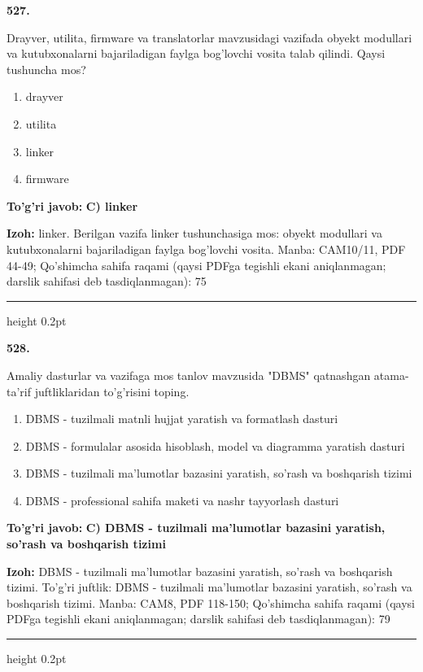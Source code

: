 \documentclass[10pt,a4paper]{article}
\begin{document}
{\bfseries\sffamily\color{ink} 527.}
\par
Drayver, utilita, firmware va translatorlar mavzusidagi vazifada obyekt modullari va kutubxonalarni bajariladigan faylga bog'lovchi vosita talab qilindi. Qaysi tushuncha mos?
\begin{enumerate}[label=\Alph*),leftmargin=9mm]
\item drayver
\item utilita
\item linker
\item firmware
\end{enumerate}
\begin{tcolorbox}[enhanced,breakable,colback=teal!4,colframe=teal!60!black,boxrule=0.45pt,arc=1.2mm,left=2.7mm,right=2.7mm,top=1.8mm,bottom=1.8mm,before skip=2mm,after skip=2mm]
{\bfseries\sffamily\color{teal}To'g'ri javob:} \textbf{C) linker}
\par\smallskip
{\bfseries Izoh:} linker. Berilgan vazifa linker tushunchasiga mos: obyekt modullari va kutubxonalarni bajariladigan faylga bog'lovchi vosita. Manba: CAM10/11, PDF 44-49; Qo'shimcha sahifa raqami (qaysi PDFga tegishli ekani aniqlanmagan; darslik sahifasi deb tasdiqlanmagan): 75
\end{tcolorbox}
\vspace{2mm}\hrule height 0.2pt\vspace{3mm}

{\bfseries\sffamily\color{ink} 528.}
\par
Amaliy dasturlar va vazifaga mos tanlov mavzusida "DBMS" qatnashgan atama-ta'rif juftliklaridan to'g'risini toping.
\begin{enumerate}[label=\Alph*),leftmargin=9mm]
\item DBMS - tuzilmali matnli hujjat yaratish va formatlash dasturi
\item DBMS - formulalar asosida hisoblash, model va diagramma yaratish dasturi
\item DBMS - tuzilmali ma'lumotlar bazasini yaratish, so'rash va boshqarish tizimi
\item DBMS - professional sahifa maketi va nashr tayyorlash dasturi
\end{enumerate}
\begin{tcolorbox}[enhanced,breakable,colback=teal!4,colframe=teal!60!black,boxrule=0.45pt,arc=1.2mm,left=2.7mm,right=2.7mm,top=1.8mm,bottom=1.8mm,before skip=2mm,after skip=2mm]
{\bfseries\sffamily\color{teal}To'g'ri javob:} \textbf{C) DBMS - tuzilmali ma'lumotlar bazasini yaratish, so'rash va boshqarish tizimi}
\par\smallskip
{\bfseries Izoh:} DBMS - tuzilmali ma'lumotlar bazasini yaratish, so'rash va boshqarish tizimi. To'g'ri juftlik: DBMS - tuzilmali ma'lumotlar bazasini yaratish, so'rash va boshqarish tizimi. Manba: CAM8, PDF 118-150; Qo'shimcha sahifa raqami (qaysi PDFga tegishli ekani aniqlanmagan; darslik sahifasi deb tasdiqlanmagan): 79
\end{tcolorbox}
\vspace{2mm}\hrule height 0.2pt\vspace{3mm}
\end{document}
